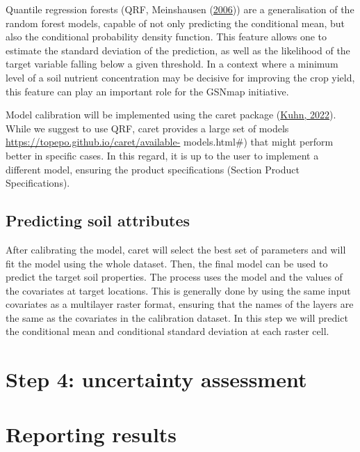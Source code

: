 \documentclass[
  10pt,
  b5paper,
  oneside]{book}
\begin{document}
Quantile regression forests (QRF, Meinshausen (\protect\hyperlink{ref-Meinshausen2006}{2006})) are a generalisation of the random forest models, capable of not only predicting the conditional mean, but also the conditional probability density function. This feature allows one to estimate the standard deviation of the prediction, as well as the likelihood of the target variable falling below a given threshold. In a context where a minimum level of a soil nutrient concentration may be decisive for improving the crop yield, this feature can play an important role for the GSNmap initiative.

Model calibration will be implemented using the caret package (\protect\hyperlink{ref-Kuhn2022}{Kuhn, 2022}). While we suggest to use QRF, caret provides a large set of models \url{https://topepo.github.io/caret/available-} models.html\#) that might perform better in specific cases. In this regard, it is up to the user to implement a different model, ensuring the product specifications (Section Product Specifications).

\hypertarget{predicting-soil-attributes}{%
\section{Predicting soil attributes}\label{predicting-soil-attributes}}

After calibrating the model, caret will select the best set of parameters and will fit the model using the whole dataset. Then, the final model can be used to predict the target soil properties. The process uses the model and the values of the covariates at target locations. This is generally done by using the same input covariates as a multilayer raster format, ensuring that the names of the layers are the same as the covariates in the calibration dataset. In this step we will predict the conditional mean and conditional standard deviation at each raster cell.

\hypertarget{step-4-uncertainty-assessment}{%
\chapter{Step 4: uncertainty assessment}\label{step-4-uncertainty-assessment}}

\hypertarget{reporting-results}{%
\chapter{Reporting results}\label{reporting-results}}
\end{document}
